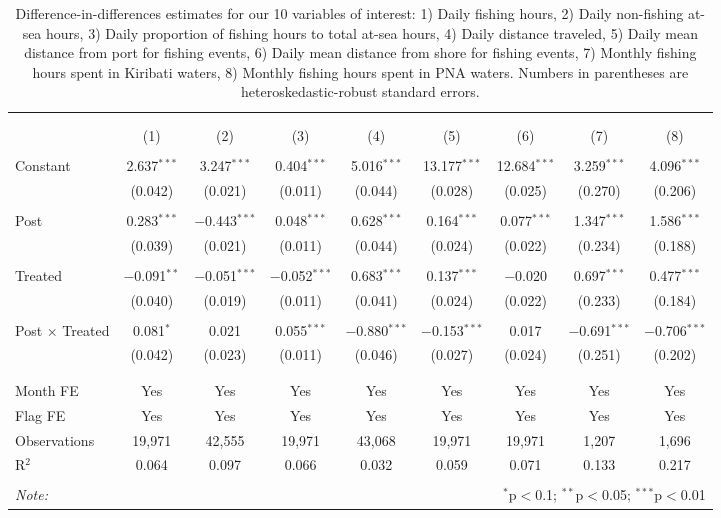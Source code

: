 
\begin{table}[!htbp] \centering 
  \caption{\label{tab:main_DID}Difference-in-differences estimates for our 10 variables of interest: 1) Daily fishing hours, 2) Daily non-fishing at-sea hours, 3) Daily proportion of fishing hours to total at-sea hours, 4) Daily distance traveled, 5) Daily mean distance from port for fishing events, 6) Daily mean distance from shore for fishing events, 7) Monthly fishing hours spent in Kiribati waters, 8) Monthly fishing hours spent in PNA waters. Numbers in parentheses are heteroskedastic-robust standard errors.} 
  \label{} 
\footnotesize 
\begin{tabular}{@{\extracolsep{1pt}}lcccccccc} 
\\[-1.8ex]\hline 
\hline \\[-1.8ex] 
\\[-1.8ex] & (1) & (2) & (3) & (4) & (5) & (6) & (7) & (8)\\ 
\hline \\[-1.8ex] 
 Constant & 2.637$^{***}$ & 3.247$^{***}$ & 0.404$^{***}$ & 5.016$^{***}$ & 13.177$^{***}$ & 12.684$^{***}$ & 3.259$^{***}$ & 4.096$^{***}$ \\ 
  & (0.042) & (0.021) & (0.011) & (0.044) & (0.028) & (0.025) & (0.270) & (0.206) \\ 
  & & & & & & & & \\ 
 Post & 0.283$^{***}$ & $-$0.443$^{***}$ & 0.048$^{***}$ & 0.628$^{***}$ & 0.164$^{***}$ & 0.077$^{***}$ & 1.347$^{***}$ & 1.586$^{***}$ \\ 
  & (0.039) & (0.021) & (0.011) & (0.044) & (0.024) & (0.022) & (0.234) & (0.188) \\ 
  & & & & & & & & \\ 
 Treated & $-$0.091$^{**}$ & $-$0.051$^{***}$ & $-$0.052$^{***}$ & 0.683$^{***}$ & 0.137$^{***}$ & $-$0.020 & 0.697$^{***}$ & 0.477$^{***}$ \\ 
  & (0.040) & (0.019) & (0.011) & (0.041) & (0.024) & (0.022) & (0.233) & (0.184) \\ 
  & & & & & & & & \\ 
 Post $\times$ Treated & 0.081$^{*}$ & 0.021 & 0.055$^{***}$ & $-$0.880$^{***}$ & $-$0.153$^{***}$ & 0.017 & $-$0.691$^{***}$ & $-$0.706$^{***}$ \\ 
  & (0.042) & (0.023) & (0.011) & (0.046) & (0.027) & (0.024) & (0.251) & (0.202) \\ 
  & & & & & & & & \\ 
\hline \\[-1.8ex] 
Month FE & Yes & Yes & Yes & Yes & Yes & Yes & Yes & Yes \\ 
Flag FE & Yes & Yes & Yes & Yes & Yes & Yes & Yes & Yes \\ 
Observations & 19,971 & 42,555 & 19,971 & 43,068 & 19,971 & 19,971 & 1,207 & 1,696 \\ 
R$^{2}$ & 0.064 & 0.097 & 0.066 & 0.032 & 0.059 & 0.071 & 0.133 & 0.217 \\ 
\hline 
\hline \\[-1.8ex] 
\textit{Note:}  & \multicolumn{8}{r}{$^{*}$p$<$0.1; $^{**}$p$<$0.05; $^{***}$p$<$0.01} \\ 
\end{tabular} 
\end{table} 
